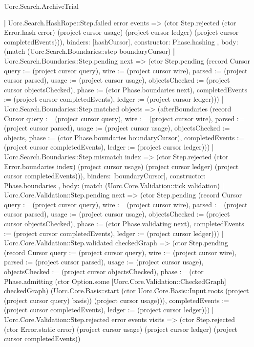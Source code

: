 \begin{lexlean}{Uorc.Search.ArchiveTrial}
\begin{semanticmodule}
{{{          | Uorc.Search.HashRope::Step.failed error events => (ctor Step.rejected (ctor Error.hash error) (project cursor usage) (project cursor ledger) (project cursor completedEvents))),
        binders: [hashCursor],
        constructor: Phase.hashing
      },
      {
        body: (match (Uorc.Search.Boundaries::step boundaryCursor)
          | Uorc.Search.Boundaries::Step.pending next => (ctor Step.pending (record Cursor {query := (project cursor query), wire := (project cursor wire), parsed := (project cursor parsed), usage := (project cursor usage), objectsChecked := (project cursor objectsChecked), phase := (ctor Phase.boundaries next), completedEvents := (project cursor completedEvents), ledger := (project cursor ledger)}))
          | Uorc.Search.Boundaries::Step.matched objects => (afterBoundaries (record Cursor {query := (project cursor query), wire := (project cursor wire), parsed := (project cursor parsed), usage := (project cursor usage), objectsChecked := objects, phase := (ctor Phase.boundaries boundaryCursor), completedEvents := (project cursor completedEvents), ledger := (project cursor ledger)}))
          | Uorc.Search.Boundaries::Step.mismatch index => (ctor Step.rejected (ctor Error.boundaries index) (project cursor usage) (project cursor ledger) (project cursor completedEvents))),
        binders: [boundaryCursor],
        constructor: Phase.boundaries
      },
      {
        body: (match (Uorc.Core.Validation::tick validation)
          | Uorc.Core.Validation::Step.pending next => (ctor Step.pending (record Cursor {query := (project cursor query), wire := (project cursor wire), parsed := (project cursor parsed), usage := (project cursor usage), objectsChecked := (project cursor objectsChecked), phase := (ctor Phase.validating next), completedEvents := (project cursor completedEvents), ledger := (project cursor ledger)}))
          | Uorc.Core.Validation::Step.validated checkedGraph => (ctor Step.pending (record Cursor {query := (project cursor query), wire := (project cursor wire), parsed := (project cursor parsed), usage := (project cursor usage), objectsChecked := (project cursor objectsChecked), phase := (ctor Phase.admitting (ctor Option.some [Uorc.Core.Validation::CheckedGraph] checkedGraph) (Uorc.Core.Basis::start (ctor Uorc.Core.Basis::Input.roots (project (project cursor query) basis)) (project cursor usage))), completedEvents := (project cursor completedEvents), ledger := (project cursor ledger)}))
          | Uorc.Core.Validation::Step.rejected error events visits => (ctor Step.rejected (ctor Error.static error) (project cursor usage) (project cursor ledger) (project cursor completedEvents))
}}}
\end{semanticmodule}
\end{lexlean}
